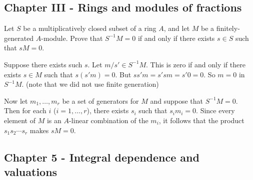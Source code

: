 \documentclass[11pt, english]{article}
\begin{document}
\subsection{Chapter III - Rings and modules of fractions}
\begin{exc}[Exercise 1]

Let $S$ be a multiplicatively closed subset of a ring $A$, and let $M$ be a finitely-generated $A$-module. Prove that $S^{-1}M=0$ if and only if there exists $s \in S$ such that $sM=0$.  
\end{exc}

\begin{sol}
 Suppose there exists such $s$. Let $m/s' \in S^{-1}M$. This is zero if and only if there exists $s \in M$ such that $s(s'm)=0$. But $ss'm=s'sm=s'0=0$. So $m=0$ in $S^{-1}M$.  (note that we did not use finite generation)

Now let $m_1,\ldots,m_r$ be a set of generators for $M$ and suppose that $S^{-1}M=0$. Then for each $i$ ($i=1,\ldots,r$), there exists $s_i$ such that $s_im_i=0$. Since every element of $M$ is an $A$-linear combination of the $m_i$, it follows that the product $s_1s_2\cdots s_r$ makes $sM=0$.
\end{sol}

\subsection{Chapter 5 - Integral dependence and valuations}
\end{document}
